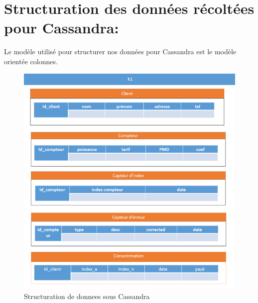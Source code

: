 \section{Structuration des données récoltées pour Cassandra:}

Le modèle utilisé pour structurer nos données pour Cassandra est le modèle orientée colonnes.

\begin{figure}[h]
	\centering
	\includegraphics[scale=1]{img/part2/2.4.png}
	\caption{Structuration de donnees sous Cassandra}
\end{figure}
